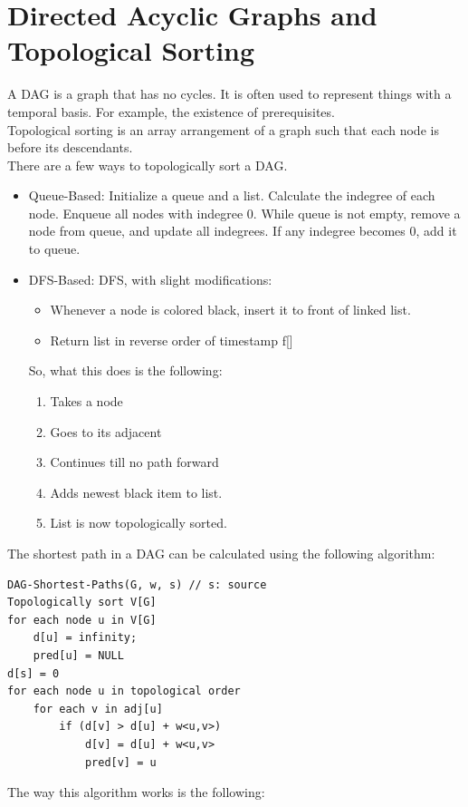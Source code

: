 \documentclass[nobib]{tufte-handout}
\begin{document}
\section{Directed Acyclic Graphs and Topological Sorting}
A DAG is a graph that has no cycles. It is often used to represent things with
a temporal basis. For example, the existence of prerequisites.\\ Topological
sorting is an array arrangement of a graph such that each node is before its
descendants.\\ There are a few ways to topologically sort a DAG.
\begin{itemize}
    \item Queue-Based: Initialize a queue and a list. Calculate the indegree of each
          node. Enqueue all nodes with indegree 0. While queue is not empty, remove a
          node from queue, and update all indegrees. If any indegree becomes 0, add it to
          queue.\\
    \item DFS-Based: DFS, with slight modifications:
        \begin{itemize}
            \item Whenever a node is colored black, insert it to front of linked list.
            \item Return list in reverse order of timestamp f[]
        \end{itemize}
        So, what this does is the following: 
        \begin{enumerate}
            \item Takes a node
            \item Goes to its adjacent
            \item Continues till no path forward
            \item Adds newest black item to list.
            \item List is now topologically sorted.
        \end{enumerate}
\end{itemize}
The shortest path in a DAG can be calculated using the following algorithm:
\begin{lstlisting}
DAG-Shortest-Paths(G, w, s) // s: source
Topologically sort V[G]
for each node u in V[G]
    d[u] = infinity; 
    pred[u] = NULL
d[s] = 0
for each node u in topological order
    for each v in adj[u]
        if (d[v] > d[u] + w<u,v>)
            d[v] = d[u] + w<u,v>
            pred[v] = u
\end{lstlisting}
The way this algorithm works is the following:
\end{document}
